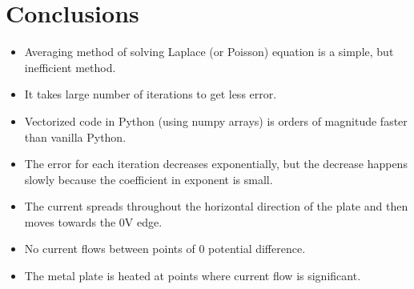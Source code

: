 \documentclass[12pt, a4paper]{article}
\begin{document}
\section{Conclusions}
\begin{itemize}
\item Averaging method of solving Laplace (or Poisson) equation is a simple, but inefficient method.
\item It takes large number of iterations to get less error.
\item Vectorized code in Python (using numpy arrays) is orders of magnitude faster than vanilla Python.
\item The error for each iteration decreases exponentially, but the decrease happens slowly because the coefficient in exponent is small.
\item The current spreads throughout the horizontal direction of the plate and then moves towards the 0V edge.
\item No current flows between points of 0 potential difference.
\item The metal plate is heated at points where current flow is significant.
\end{itemize}
\end{document}

